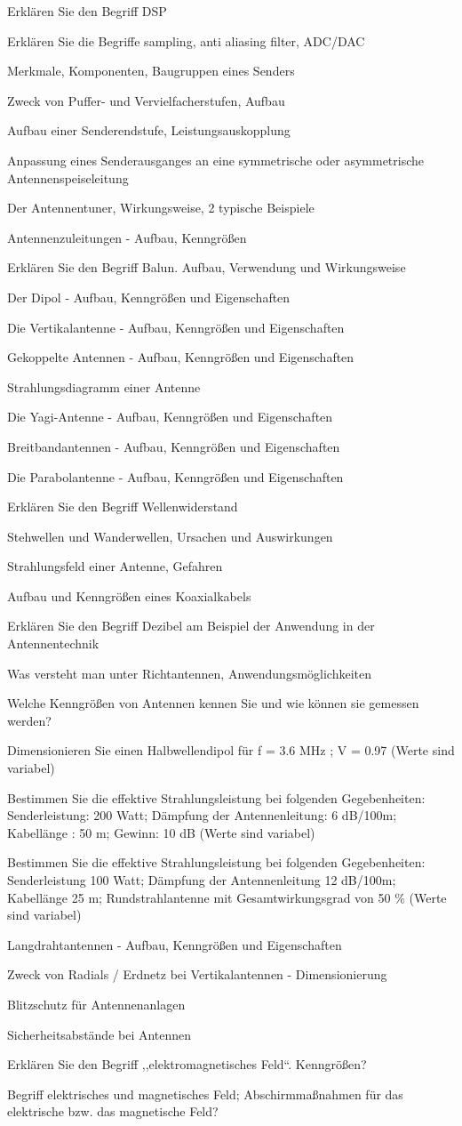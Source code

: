 \documentclass[avery5371,grid,frame,a4paper]{flashcards}
\newcommand\question[2]{
  \begin{flashcard}[{\chap} -- #1]{#2}\end{flashcard}
}
\begin{document}
\question{55}{Erklären Sie den Begriff DSP}
\question{56}{Erklären Sie die Begriffe sampling, anti aliasing filter, ADC/DAC}
\question{57}{Merkmale, Komponenten, Baugruppen eines Senders}
\question{58}{Zweck von Puffer- und Vervielfacherstufen, Aufbau}
\question{59}{Aufbau einer Senderendstufe, Leistungsauskopplung}
\question{60}{Anpassung eines Senderausganges an eine symmetrische oder asymmetrische Antennenspeiseleitung}
\question{61}{Der Antennentuner, Wirkungsweise, 2 typische Beispiele}
\question{62}{Antennenzuleitungen - Aufbau, Kenngrößen}
\question{63}{Erklären Sie den Begriff Balun. Aufbau, Verwendung und Wirkungsweise}
\question{64}{Der Dipol - Aufbau, Kenngrößen und Eigenschaften}
\question{65}{Die Vertikalantenne - Aufbau, Kenngrößen und Eigenschaften}
\question{66}{Gekoppelte Antennen - Aufbau, Kenngrößen und Eigenschaften}
\question{67}{Strahlungsdiagramm einer Antenne}
\question{68}{Die Yagi-Antenne - Aufbau, Kenngrößen und Eigenschaften}
\question{69}{Breitbandantennen - Aufbau, Kenngrößen und Eigenschaften}
\question{70}{Die Parabolantenne - Aufbau, Kenngrößen und Eigenschaften}
\question{71}{Erklären Sie den Begriff Wellenwiderstand}
\question{72}{Stehwellen und Wanderwellen, Ursachen und Auswirkungen}
\question{73}{Strahlungsfeld einer Antenne, Gefahren}
\question{74}{Aufbau und Kenngrößen eines Koaxialkabels}
\question{75}{Erklären Sie den Begriff Dezibel am Beispiel der Anwendung in der Antennentechnik}
\question{76}{Was versteht man unter Richtantennen, Anwendungsmöglichkeiten}
\question{77}{Welche Kenngrößen von Antennen kennen Sie und wie können sie gemessen werden?}
\question{78}{Dimensionieren Sie einen Halbwellendipol für f = 3.6 MHz ; V = 0.97 (Werte sind variabel)}
\question{79}{Bestimmen Sie die effektive Strahlungsleistung bei folgenden Gegebenheiten: Senderleistung: 200 Watt; Dämpfung der Antennenleitung: 6 dB/100m; Kabellänge : 50 m; Gewinn: 10 dB (Werte sind variabel)}
\question{80}{Bestimmen Sie die effektive Strahlungsleistung bei folgenden Gegebenheiten: Senderleistung 100 Watt; Dämpfung der Antennenleitung 12 dB/100m; Kabellänge 25 m; Rundstrahlantenne mit Gesamtwirkungsgrad von 50 \% (Werte sind variabel)}
\question{81}{Langdrahtantennen - Aufbau, Kenngrößen und Eigenschaften}
\question{82}{Zweck von Radials / Erdnetz bei Vertikalantennen - Dimensionierung}
\question{83}{Blitzschutz für Antennenanlagen}
\question{84}{Sicherheitsabstände bei Antennen}
\question{85}{Erklären Sie den Begriff ,,elektromagnetisches Feld``. Kenngrößen?}
\question{86}{Begriff elektrisches und magnetisches Feld; Abschirmmaßnahmen für das elektrische bzw. das magnetische Feld?}
\end{document}
